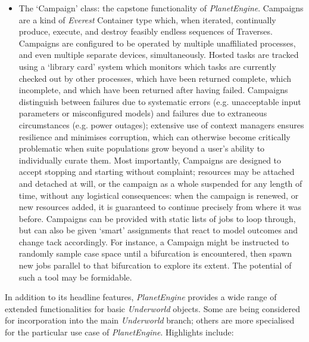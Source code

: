 \documentclass[a4paper,11pt,oneside]{book}
\begin{document}
\begin{itemize}
\item The `Campaign' class: the capstone functionality of \textit{PlanetEngine}. Campaigns are a kind of \textit{Everest} Container type which, when iterated, continually produce, execute, and destroy feasibly endless sequences of Traverses. Campaigns are configured to be operated by multiple unaffiliated processes, and even multiple separate devices, simultaneously. Hosted tasks are tracked using a `library card' system which monitors which tasks are currently checked out by other processes, which have been returned complete, which incomplete, and which have been returned after having failed. Campaigns distinguish between failures due to systematic errors (e.g. unacceptable input parameters or misconfigured models) and failures due to extraneous circumstances (e.g. power outages); extensive use of context managers ensures resilience and minimises corruption, which can otherwise become critically problematic when suite populations grow beyond a user's ability to individually curate them. Most importantly, Campaigns are designed to accept stopping and starting without complaint; resources may be attached and detached at will, or the campaign as a whole suspended for any length of time, without any logistical consequences: when the campaign is renewed, or new resources added, it is guaranteed to continue precisely from where it was before. Campaigns can be provided with static lists of jobs to loop through, but can also be given `smart' assignments that react to model outcomes and change tack accordingly. For instance, a Campaign might be instructed to randomly sample case space until a bifurcation is encountered, then spawn new jobs parallel to that bifurcation to explore its extent. The potential of such a tool may be formidable.
\end{itemize}

In addition to its headline features, \textit{PlanetEngine} provides a wide range of extended functionalities for basic \textit{Underworld} objects. Some are being considered for incorporation into the main \textit{Underworld} branch; others are more specialised for the particular use case of \textit{PlanetEngine}. Highlights include:
\end{document}
